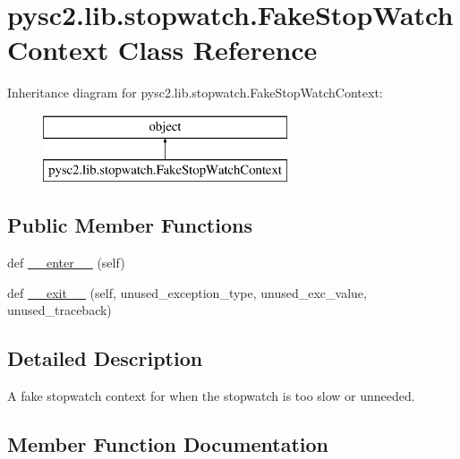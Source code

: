 \hypertarget{classpysc2_1_1lib_1_1stopwatch_1_1_fake_stop_watch_context}{}\section{pysc2.\+lib.\+stopwatch.\+Fake\+Stop\+Watch\+Context Class Reference}
\label{classpysc2_1_1lib_1_1stopwatch_1_1_fake_stop_watch_context}
Inheritance diagram for pysc2.\+lib.\+stopwatch.\+Fake\+Stop\+Watch\+Context\+:\begin{figure}[H]
\begin{center}
\leavevmode
\includegraphics[height=2.000000cm]{classpysc2_1_1lib_1_1stopwatch_1_1_fake_stop_watch_context}
\end{center}
\end{figure}
\subsection*{Public Member Functions}
\begin{DoxyCompactItemize}
\item 
def \mbox{\hyperlink{classpysc2_1_1lib_1_1stopwatch_1_1_fake_stop_watch_context_a6f9d0d3e72aecb0fa76716d5a4ecc71d}{\+\_\+\+\_\+enter\+\_\+\+\_\+}} (self)
\item 
def \mbox{\hyperlink{classpysc2_1_1lib_1_1stopwatch_1_1_fake_stop_watch_context_a039be4e6cc198a84e03e20002d97d34f}{\+\_\+\+\_\+exit\+\_\+\+\_\+}} (self, unused\+\_\+exception\+\_\+type, unused\+\_\+exc\+\_\+value, unused\+\_\+traceback)
\end{DoxyCompactItemize}


\subsection{Detailed Description}
\begin{DoxyVerb}A fake stopwatch context for when the stopwatch is too slow or unneeded.\end{DoxyVerb}
 

\subsection{Member Function Documentation}
\mbox{\label{classpysc2_1_1lib_1_1stopwatch_1_1_fake_stop_watch_context_a6f9d0d3e72aecb0fa76716d5a4ecc71d}} 
